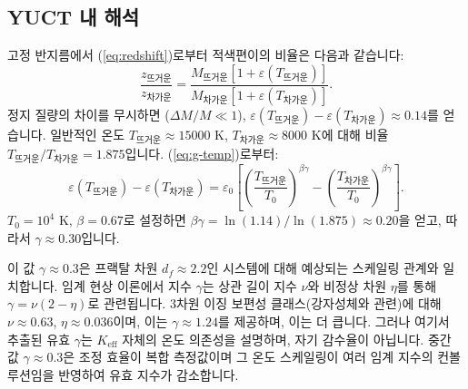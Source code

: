 \documentclass[11pt,a4paper]{article}
\newcommand{\Keff}{K_{\mathrm{eff}}}
\newcommand{\eps}{\varepsilon}
\newcommand{\df}{d_{\!f}}
\begin{document}
	\subsection{YUCT 내 해석}
	\label{subsec:wd-yuct}
	
	고정 반지름에서 (\ref{eq:redshift})로부터 적색편이의 비율은 다음과 같습니다:
	\begin{equation}
		\frac{z_{\text{뜨거운}}}{z_{\text{차가운}}} = \frac{M_{\text{뜨거운}}[1+\eps(T_{\text{뜨거운}})]}{M_{\text{차가운}}[1+\eps(T_{\text{차가운}})]}.
		\label{eq:redshift-ratio}
	\end{equation}
	정지 질량의 차이를 무시하면 ($\Delta M/M \ll 1$), $\eps(T_{\text{뜨거운}}) - \eps(T_{\text{차가운}}) \approx 0.14$를 얻습니다. 일반적인 온도 $T_{\text{뜨거운}} \approx 15000$ K, $T_{\text{차가운}} \approx 8000$ K에 대해 비율 $T_{\text{뜨거운}}/T_{\text{차가운}} = 1.875$입니다. (\ref{eq:g-temp})로부터:
	\begin{equation}
		\eps(T_{\text{뜨거운}}) - \eps(T_{\text{차가운}}) = \eps_0 \left[ \left( \frac{T_{\text{뜨거운}}}{T_0} \right)^{\beta\gamma} - \left( \frac{T_{\text{차가운}}}{T_0} \right)^{\beta\gamma} \right].
		\label{eq:eps-diff}
	\end{equation}
	$T_0 = 10^4$ K, $\beta = 0.67$로 설정하면 $\beta\gamma = \ln(1.14) / \ln(1.875) \approx 0.20$을 얻고, 따라서 $\gamma \approx 0.30$입니다.
	
	이 값 $\gamma \approx 0.3$은 프랙탈 차원 $\df \approx 2.2$인 시스템에 대해 예상되는 스케일링 관계와 일치합니다. 임계 현상 이론에서 지수 $\gamma$는 상관 길이 지수 $\nu$와 비정상 차원 $\eta$를 통해 $\gamma = \nu(2-\eta)$로 관련됩니다. 3차원 이징 보편성 클래스(강자성체와 관련)에 대해 $\nu \approx 0.63$, $\eta \approx 0.036$이며, 이는 $\gamma \approx 1.24$를 제공하며, 이는 더 큽니다. 그러나 여기서 추출된 유효 $\gamma$는 $\Keff$ 자체의 온도 의존성을 설명하며, 자기 감수율이 아닙니다. 중간 값 $\gamma \approx 0.3$은 조정 효율이 복합 측정값이며 그 온도 스케일링이 여러 임계 지수의 컨볼루션임을 반영하여 유효 지수가 감소합니다.
	
\end{document}
